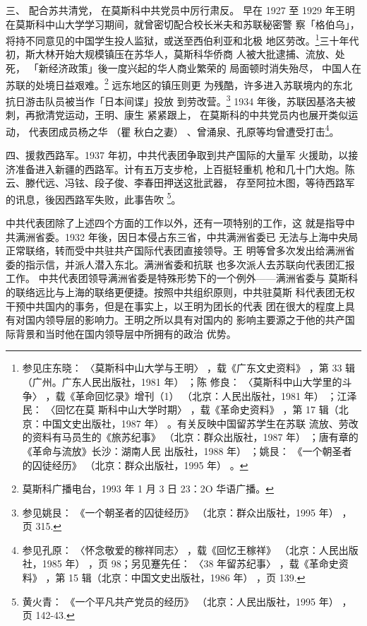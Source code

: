 三、
配合苏共清党，
在莫斯科中共党员中厉行肃反。
早在 1927 至 1929
年王明在莫斯科中山大学学习期间，就曾密切配合校长米夫和苏联秘密警
察「格伯乌」，将持不同意见的中国学生投人监狱，或送至西伯利亚和北极
地区劳改。\footnote{参见庄东晓：
〈莫斯科中山大学与王明〉
，载《广东文史资料》
，第 33 辑（广州。广东人民出版社，1981 年）
；陈
修良：
〈莫斯科中山大学里的斗争〉
，载《革命回忆录》增刊（1）
（北京：人民出版社，1981 年）
；江泽民：
〈回忆在莫
斯科中山大学时期〉
，载《革命史资料》
，第 17 辑（北京：中国文史出版社，1987 年）
。有关反映中国留苏学生在苏联
流放、劳改的资料有马员生的《旅苏纪事》
（北京：群众出版社，1987 年）
；唐有章的《革命与流放》长沙：湖南人民
出版社，1988 年）
；姚艮：
《一个朝圣者的囚徒经历》
（北京：群众出版社，1995 年）
。}三十年代初，斯大林开始大规模镇压在苏华人，莫斯科华侨商
人被大批逮捕、流放、处死，
「新经济政策」後一度兴起的华人商业繁荣的
局面顿时消失殆尽，
中国人在苏联的处境日益艰难。\footnote{莫斯科广播电台，1993 年 1 月 3 日 23：2O 华语广播。} 远东地区的镇压则更
为残酷，许多进入苏联境内的东北抗日游击队员被当作「日本间谍」投放
到劳改营。\footnote{参见姚艮：
《一个朝圣者的囚徒经历》
（北京：群众出版社，1995 年）
，页 315.} 1934 年後，苏联因基洛夫被刺，再掀清党运动，王明、康生
紧紧跟上，
在莫斯科的中共党员内也展开类似运动，
代表团成员杨之华
（瞿 秋白之妻） 、曾涌泉、孔原等均曾遭受打击\footnote{参见孔原：
〈怀念敬爱的稼祥同志〉
，载《回忆王稼祥》
（北京：人民出版社，1985 年）
，页 98；另见蹇先任：
〈38
年留苏纪事〉
，载《革命史资料》
，第 15 辑（北京：中国文史出版社，1986 年）
，页 139.}。

四、援救西路军。1937 年初，中共代表团争取到共产国际的大量军
火援助，以接济准备进入新疆的西路军。计有五万支步枪，上百挺轻重机
枪和几十门大炮。陈云、滕代远、冯铉、段子俊、李春田押送这批武器，
存至阿拉木图，等待西路军的讯息，後因西路军失败，此事告吹
\footnote{黄火青：
《一个平凡共产党员的经历》
（北京：人民出版社，1995 年）
，页 142-43.}。

中共代表团除了上述四个方面的工作以外，还有一项特别的工作，这
就是指导中共满洲省委。1932 年後，因日本侵占东三省，中共满洲省委已
无法与上海中央局正常联络，转而受中共驻共产国际代表团直接领导。王
明等曾多次发出给满洲省委的指示信，并派人潜入东北。满洲省委和抗联
也多次派人去苏联向代表团汇报工作。
中共代表团领导满洲省委是特殊形势下的一个例外——满洲省委与
莫斯科的联络远比与上海的联络更便捷。按照中共组织原则，中共驻莫斯
科代表团无权干预中共国内的事务，但是在事实上，以王明为团长的代表
团在很大的程度上具有对国内领导层的影响力。王明之所以具有对国内的
影响主要源之于他的共产国际背景和当时他在国内领导层中所拥有的政治
优势。

